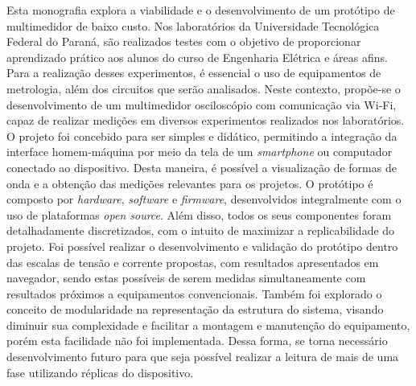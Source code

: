 

\begin{resumoutfpr}%
Esta monografia explora a viabilidade e o desenvolvimento de um protótipo de multimedidor de baixo custo. Nos laboratórios da Universidade Tecnológica Federal do Paraná, são realizados testes com o objetivo de proporcionar aprendizado prático aos alunos do curso de Engenharia Elétrica e áreas afins. Para a realização desses experimentos, é essencial o uso de equipamentos de metrologia, além dos circuitos que serão analisados.
Neste contexto, propõe-se o desenvolvimento de um multimedidor osciloscópio com comunicação via \gls{Wi-Fi}, capaz de realizar medições em diversos experimentos realizados nos laboratórios. O projeto foi concebido para ser simples e didático, permitindo a integração da interface homem-máquina por meio da tela de um \textit{smartphone} ou computador conectado ao dispositivo. Desta maneira, é possível a visualização de formas de onda e a obtenção das medições relevantes para os projetos.
O protótipo é composto por \textit{hardware}, \textit{software} e \textit{firmware}, desenvolvidos integralmente com o uso de plataformas \textit{open source}. Além disso, todos os seus componentes foram detalhadamente discretizados, com o intuito de maximizar a replicabilidade do projeto.
Foi possível realizar o desenvolvimento e validação do protótipo dentro das escalas de tensão e corrente propostas, com resultados apresentados em navegador, sendo estas possíveis de serem medidas simultaneamente com resultados próximos a equipamentos convencionais.  
Também foi explorado o conceito de modularidade na representação da estrutura do sistema, visando diminuir sua complexidade e facilitar a montagem e manutenção do equipamento, porém esta facilidade não foi implementada. Dessa forma, se torna necessário desenvolvimento futuro para que seja possível realizar a leitura de mais de uma fase utilizando réplicas do dispositivo.
\end{resumoutfpr}
